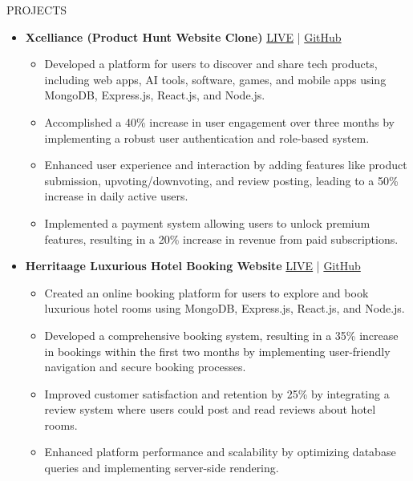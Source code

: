 \documentclass{resume} %
\begin{document}
\begin{rSection}{PROJECTS}

\begin{itemize}
    \item \textbf{Xcelliance (Product Hunt Website Clone)} \hfill {\href{https://xcelliance.firebaseapp.com/}{LIVE} | \href{https://github.com/jaynabKhatun/xcelliance-tech-website}{GitHub}}
    \begin{itemize}
        \item Developed a platform for users to discover and share tech products, including web apps, AI tools, software, games, and mobile apps using MongoDB, Express.js, React.js, and Node.js.
        \item Accomplished a 40\% increase in user engagement over three months by implementing a robust user authentication and role-based system.
        \item Enhanced user experience and interaction by adding features like product submission, upvoting/downvoting, and review posting, leading to a 50\% increase in daily active users.
        \item Implemented a payment system allowing users to unlock premium features, resulting in a 20\% increase in revenue from paid subscriptions.
    \end{itemize}
    
    \item \textbf{Herritaage Luxurious Hotel Booking Website} \hfill {\href{https://herritage-1b537.web.app}{LIVE} | \href{https://github.com/jaynabKhatun/Luxury-hotel-booking-client-side}{GitHub}}
    \begin{itemize}
        \item Created an online booking platform for users to explore and book luxurious hotel rooms using MongoDB, Express.js, React.js, and Node.js.
        \item Developed a comprehensive booking system, resulting in a 35\% increase in bookings within the first two months by implementing user-friendly navigation and secure booking processes.
        \item Improved customer satisfaction and retention by 25\% by integrating a review system where users could post and read reviews about hotel rooms.
        \item Enhanced platform performance and scalability by optimizing database queries and implementing server-side rendering.
    \end{itemize}
    

\end{itemize}
\end{rSection}
\end{document}
